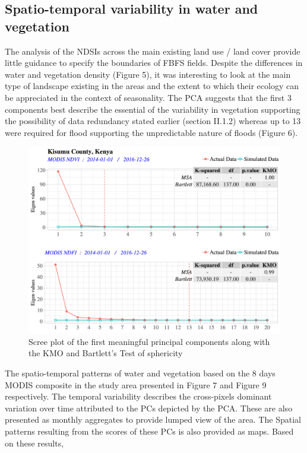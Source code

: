 \documentclass[12pt,oneside]{article}
\begin{document}
\hypertarget{II.3}{%
\subsection{Spatio-temporal variability in water and
vegetation}\label{II.3}}

The analysis of the NDSIs across the main existing land use / land cover
provide little guidance to specify the boundaries of FBFS fields.
Despite the differences in water and vegetation density (Figure 5), it
was interesting to look at the main type of landscape existing in the
areas and the extent to which their ecology can be appreciated in the
context of seasonality. The PCA suggests that the first 3 components
best describe the essential of the variability in vegetation supporting
the possibility of data redundancy stated earlier (section II.1.2)
whereas up to 13 were required for flood supporting the unpredictable
nature of floods (Figure 6).

\begin{figure}
\includegraphics[width=1\linewidth]{figures/Mapping_FBFS_NDVI_NDFI_parallel_analysis_sreeplot} \caption{Scree plot of the first meaningful principal components along with the KMO and Bartlett's Test of sphericity}\label{fig:fig6}
\end{figure}

The spatio-temporal patterns of water and vegetation based on the 8 days
MODIS composite in the study area presented in Figure 7 and Figure 9
respectively. The temporal variability describes the cross-pixels
dominant variation over time attributed to the PCs depicted by the PCA.
These are also presented as monthly aggregates to provide lumped view of
the area. The Spatial patterns resulting from the scores of these PCs is
also provided as maps. Based on these results,
\end{document}
